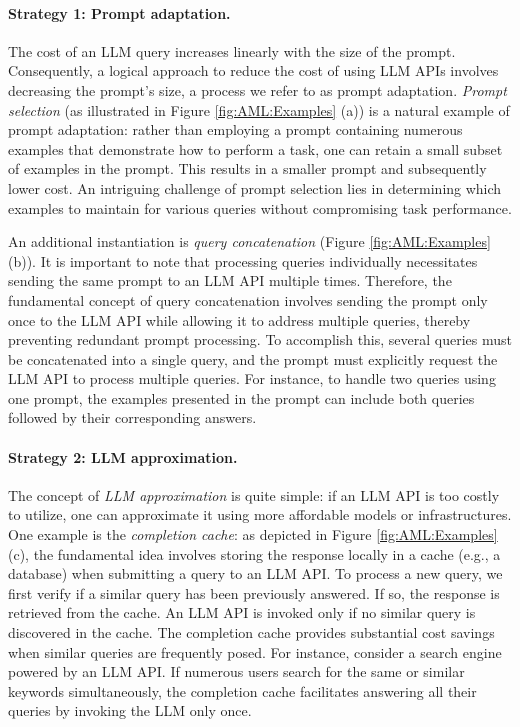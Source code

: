 \documentclass{article}
\begin{document}
\paragraph{Strategy 1: Prompt adaptation.} 
The cost of an LLM query increases linearly with the size of the prompt. Consequently, a logical approach to reduce the cost of using LLM APIs involves decreasing the prompt's size, a process we refer to as prompt adaptation. \textit{Prompt selection} (as illustrated in Figure \ref{fig:AML:Examples} (a)) is a natural example of prompt adaptation: rather than employing a prompt containing numerous examples that demonstrate how to perform a task, one can retain a small subset of examples in the prompt. This results in a smaller prompt and subsequently lower cost. An intriguing challenge of prompt selection lies in determining which examples to maintain for various queries without compromising task performance.

An additional instantiation is \textit{query concatenation} (Figure \ref{fig:AML:Examples} (b)). It is important to note that processing queries individually necessitates sending the same prompt to an LLM API multiple times. Therefore, the fundamental concept of query concatenation involves sending the prompt only once to the LLM API while allowing it to address multiple queries, thereby preventing redundant prompt processing. To accomplish this, several queries must be concatenated into a single query, and the prompt must explicitly request the LLM API to process multiple queries. For instance, to handle two queries using one prompt, the examples presented in the prompt can include both queries followed by their corresponding answers.

\paragraph{Strategy 2: LLM approximation.} The concept of \textit{LLM approximation} is quite simple: if an LLM API is too costly to utilize, one can approximate it using more affordable models or infrastructures. One example is the \textit{completion cache}: as depicted in Figure \ref{fig:AML:Examples} (c), the fundamental idea involves storing the response locally in a cache (e.g., a database) when submitting a query to an LLM API. To process a new query, we first verify if a similar query has been previously answered. If so, the response is retrieved from the cache. An LLM API is invoked only if no similar query is discovered in the cache. The completion cache provides substantial cost savings when similar queries are frequently posed. For instance, consider a search engine powered by an LLM API. If numerous users search for the same or similar keywords simultaneously, the completion cache facilitates answering all their queries by invoking the LLM only once.
\end{document}
